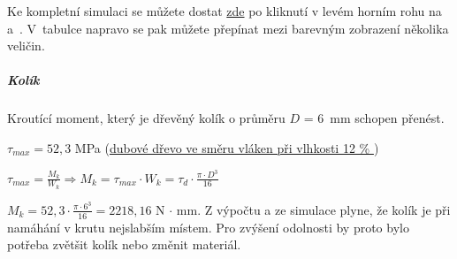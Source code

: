 Ke kompletní simulaci se můžete dostat \href{https://myhub.autodesk360.com/ue2d7aa41/g/shares/SH56a43QTfd62c1cd96843f1e03a0eb48053?viewState=NoIgbgDAdAjCA0IDeAdEAXAngBwKZoC40BlASwFsBXAGwEN1SB7AOzXjVoGdPd1C0ARjABsATlEQItALQBjcbmkAWCMIjSBuWgA5lAM22ilAVgAmMAOyy9\%2BBGkYCAVrlnoAkqcIBmAL4gAukA}{zde}
\parencite{simulase_mechnické} po kliknutí v levém horním rohu na  a~. V~tabulce napravo se pak můžete přepínat mezi barevným zobrazení několika veličin.

\subparagraph{Kolík}
Kroutící moment, který je dřevěný kolík o průměru $D$ = 6~mm schopen přenést. %

\begin{table}[h]
    \centering
    \caption{Tabulka značení veličin pro napětí v kolíku v krutu}
    \label{tab:M3_symboly_kolik_otaceni}
\end{table}

$ \tau_{max} = 52,3 $ MPa (\href{https://is.mendelu.cz/eknihovna/opory/zobraz_cast.pl?fit_w=1;cast=9190}{dubové dřevo ve směru vláken při vlhkosti 12 \% } \parencite{pevnost_dreva})

$ \tau_{max} = \frac{M_k}{W_k} \Rightarrow M_k = \tau_{max} \cdot W_k = \tau _d \cdot \frac{\pi \cdot D^3}{16} $

$ M_k = 52,3 \cdot \frac{\pi \cdot 6^3}{16} = 2 218,16 $ N $\cdot$ mm. Z výpočtu a ze simulace plyne, že kolík je při namáhání v krutu nejslabším místem. Pro zvýšení odolnosti by proto bylo 
potřeba zvětšit kolík nebo změnit materiál.